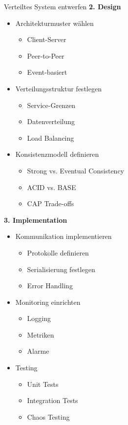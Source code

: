 \begin{KR}{Verteiltes System entwerfen}
\textbf{2. Design}
\begin{itemize}
    \item Architekturmuster wählen
    \begin{itemize}
        \item Client-Server
        \item Peer-to-Peer
        \item Event-basiert
    \end{itemize}
    \item Verteilungsstruktur festlegen
    \begin{itemize}
        \item Service-Grenzen
        \item Datenverteilung
        \item Load Balancing
    \end{itemize}
    \item Konsistenzmodell definieren
    \begin{itemize}
        \item Strong vs. Eventual Consistency
        \item ACID vs. BASE
        \item CAP Trade-offs
    \end{itemize}
\end{itemize}

\textbf{3. Implementation}
\begin{itemize}
    \item Kommunikation implementieren
    \begin{itemize}
        \item Protokolle definieren
        \item Serialisierung festlegen
        \item Error Handling
    \end{itemize}
    \item Monitoring einrichten
    \begin{itemize}
        \item Logging
        \item Metriken
        \item Alarme
    \end{itemize}
    \item Testing
    \begin{itemize}
        \item Unit Tests
        \item Integration Tests
        \item Chaos Testing
    \end{itemize}
\end{itemize}
\end{KR}

